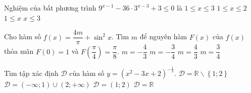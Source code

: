 \begin{ex}%
Nghiệm của bất phương trình $9^{x-1}-36\cdot 3^{x-3}+3\le 0$ là
\choice
{$1\le x\le 3$}
{\True $1\le x\le 2$}
{$1\le x$}
{$x\le 3$}
\end{ex}
\begin{ex}%
Cho hàm số $f(x)=\dfrac{4m}{\pi}+\sin^2x$. Tìm $m$ để nguyên hàm $F(x)$ của $f(x)$ thỏa mãn $F(0)=1$ và $F\left(\dfrac{\pi}{4}\right)=\dfrac{\pi}{8}$.
\choice
{$m=-\dfrac{4}{3}$}
{\True $m=-\dfrac{3}{4}$}
{$m=\dfrac{4}{3}$}
{$m=\dfrac{3}{4}$}
\end{ex}
\begin{ex}%
Tìm tập xác định $\mathscr{D}$ của hàm số $y=\left(x^2-3x+2\right)^{-\frac{1}{3}}$.
\choice
{$\mathscr{D}=\mathbb{R}\backslash\left\{1;2\right\}$}
{\True $\mathscr{D}=\left(-\infty;1\right)\cup\left(2;+\infty\right)$}
{$\mathscr{D}=(1;2)$}
{$\mathscr{D}=\mathbb{R}$}
\end{ex}
